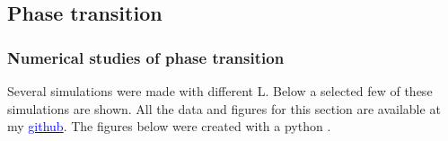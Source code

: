 






















\pagebreak
\subsection{Phase transition}



\subsubsection{Numerical studies of phase transition}

Several simulations were made with different L. Below a selected few of these simulations are shown. All the data and figures for this section are available at my \href{https://github.com/erikfsk/Project-4/tree/master/Project4/Result/4e/}{\textcolor{blue}{github}}. The figures below were created with a python \href{https://github.com/erikfsk/Project-4/blob/master/Project4/Result/4e/plot-4e.py}{\color{blue}{script}}.

